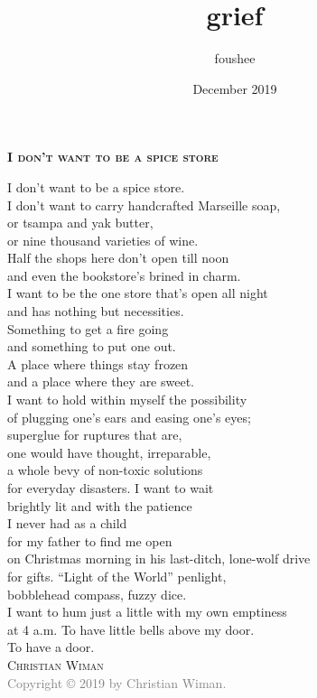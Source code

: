\documentclass[14pt]{memoir}
\title{grief}
\author{foushee }
\date{December 2019}
\begin{document}
\thispagestyle{empty}
\textbf{\textsc{\large I don't want to be a spice store}}
\vspace{32pt}

I don't want to be a spice store.\\
I don't want to carry handcrafted Marseille soap,\\
or tsampa and yak butter,\\
or nine thousand varieties of wine.\\
Half the shops here don't open till noon\\
and even the bookstore's brined in charm.\\
I want to be the one store that's open all night\\
and has nothing but necessities.\\
Something to get a fire going\\
and something to put one out.\\
A place where things stay frozen\\
and a place where they are sweet.\\
I want to hold within myself the possibility\\
of plugging one's ears and easing one's eyes;\\
superglue for ruptures that are,\\
one would have thought, irreparable,\\
a whole bevy of non-toxic solutions\\
for everyday disasters. I want to wait\\
brightly lit and with the patience\\
I never had as a child\\
for my father to find me open\\
on Christmas morning in his last-ditch, lone-wolf drive\\
for gifts. ``Light of the World'' penlight,\\
bobblehead compass, fuzzy dice.\\
I want to hum just a little with my own emptiness\\
at 4 a.m. To have little bells above my door.\\
To have a door.\\

\vspace{12pt}
\hspace{90pt} \textsc{Christian Wiman}\\
\vfill
\noindent\footnotesize{
\textcolor{gray}{Copyright © 2019 by Christian Wiman.}} %
\end{document}
